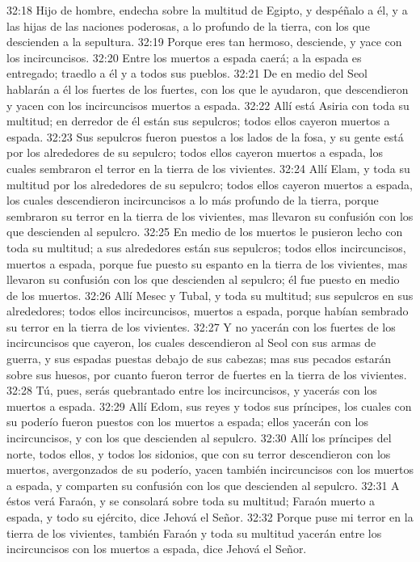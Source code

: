 32:18 Hijo de hombre, endecha sobre la multitud de Egipto, y despéñalo a él, y a las hijas de las naciones poderosas, a lo profundo de la tierra, con los que descienden a la sepultura.   
32:19 Porque eres tan hermoso, desciende, y yace con los incircuncisos.   
32:20 Entre los muertos a espada caerá; a la espada es entregado; traedlo a él y a todos sus pueblos.   
32:21 De en medio del Seol hablarán a él los fuertes de los fuertes, con los que le ayudaron, que descendieron y yacen con los incircuncisos muertos a espada.   
32:22 Allí está Asiria con toda su multitud; en derredor de él están sus sepulcros; todos ellos cayeron muertos a espada.   
32:23 Sus sepulcros fueron puestos a los lados de la fosa, y su gente está por los alrededores de su sepulcro; todos ellos cayeron muertos a espada, los cuales sembraron el terror en la tierra de los vivientes.   
32:24 Allí Elam, y toda su multitud por los alrededores de su sepulcro; todos ellos cayeron muertos a espada, los cuales descendieron incircuncisos a lo más profundo de la tierra, porque sembraron su terror en la tierra de los vivientes, mas llevaron su confusión con los que descienden al sepulcro.   
32:25 En medio de los muertos le pusieron lecho con toda su multitud; a sus alrededores están sus sepulcros; todos ellos incircuncisos, muertos a espada, porque fue puesto su espanto en la tierra de los vivientes, mas llevaron su confusión con los que descienden al sepulcro; él fue puesto en medio de los muertos.   
32:26 Allí Mesec y Tubal, y toda su multitud; sus sepulcros en sus alrededores; todos ellos incircuncisos, muertos a espada, porque habían sembrado su terror en la tierra de los vivientes.   
32:27 Y no yacerán con los fuertes de los incircuncisos que cayeron, los cuales descendieron al Seol con sus armas de guerra, y sus espadas puestas debajo de sus cabezas; mas sus pecados estarán sobre sus huesos, por cuanto fueron terror de fuertes en la tierra de los vivientes.   
32:28 Tú, pues, serás quebrantado entre los incircuncisos, y yacerás con los muertos a espada. 
32:29 Allí Edom, sus reyes y todos sus príncipes, los cuales con su poderío fueron puestos con los muertos a espada; ellos yacerán con los incircuncisos, y con los que descienden al sepulcro.   
32:30 Allí los príncipes del norte, todos ellos, y todos los sidonios, que con su terror descendieron con los muertos, avergonzados de su poderío, yacen también incircuncisos con los muertos a espada, y comparten su confusión con los que descienden al sepulcro.   
32:31 A éstos verá Faraón, y se consolará sobre toda su multitud; Faraón muerto a espada, y todo su ejército, dice Jehová el Señor.   
32:32 Porque puse mi terror en la tierra de los vivientes, también Faraón y toda su multitud yacerán entre los incircuncisos con los muertos a espada, dice Jehová el Señor. 
